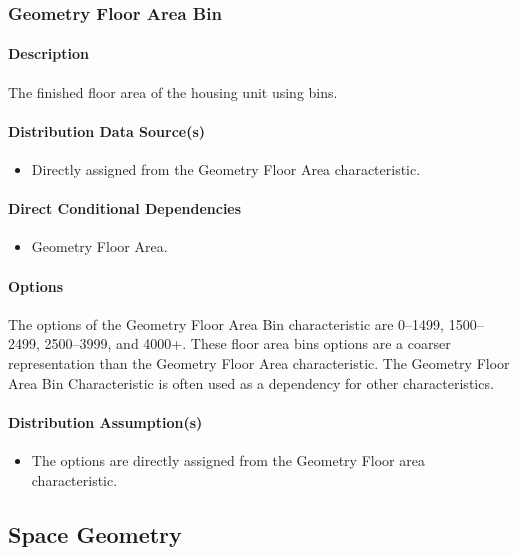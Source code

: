\subsubsection{Geometry Floor Area Bin}
\paragraph{Description}
The finished floor area of the housing unit using bins. 

\paragraph{Distribution Data Source(s)}
\begin{itemize}
    \item Directly assigned from the Geometry Floor Area characteristic.
\end{itemize}

\paragraph{Direct Conditional Dependencies}
\begin{itemize}
    \item Geometry Floor Area.
\end{itemize}

\paragraph{Options}
The options of the Geometry Floor Area Bin characteristic are 0--1499, 1500--2499, 2500--3999, and 4000+. These floor area bins options are a coarser representation than the Geometry Floor Area characteristic. The Geometry Floor Area Bin Characteristic is often used as a dependency for other characteristics.

\paragraph{Distribution Assumption(s)}
\begin{itemize}
    \item The options are directly assigned from the Geometry Floor area characteristic.
\end{itemize}

\subsection{Space Geometry}
\label{space_geometry}

